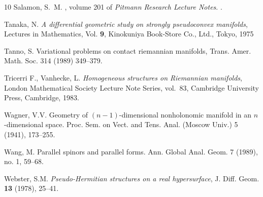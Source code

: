 \documentclass{amsart}
\theoremstyle{plain}
\theoremstyle{definition}
\newcommand{\1}{\mathbf{1}}
\newcommand{\+}{\oplus}
\begin{document}
\begin{thebibliography}{10}
 Salamon, S.~M.
, volume 201 of {\em
  Pitmann Research Lecture Notes}.
.




  Tanaka, N.
\emph{A differential geometric study on strongly pseudoconvex manifolds}, Lectures in Mathematics,
Vol. \textbf{9}, Kinokuniya Book-Store Co., Ltd., Tokyo, 1975

  Tanno, S. Variational problems on contact riemannian manifolds, Trans. Amer. Math. Soc. 314 (1989) 349–379.


Tricerri F., Vanhecke, L. \emph{Homogeneous structures on {R}iemannian
  manifolds}, London Mathematical Society Lecture Note Series, vol.~83,
  Cambridge University Press, Cambridge, 1983. 


 Wagner, V.V. Geometry of $(n-1)$-dimensional nonholonomic manifold in an $n$-dimensional space. Proc. Sem. on Vect. and Tens. Anal. (Moscow Univ.)  5 (1941), 173--255.



 Wang, M. {Parallel spinors and parallel forms}. Ann.
Global Anal. Geom. 7 (1989), no. 1, 59--68.

  Webster, S.M. 
\emph{Pseudo-Hermitian structures on a real hypersurface}, 
J. Diff. Geom. \textbf{13} (1978), 25–41.


\end{thebibliography}
\end{document}
